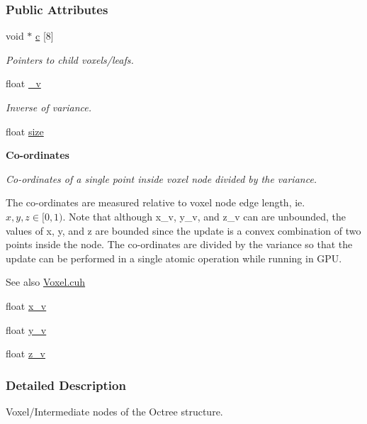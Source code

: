 \subsubsection*{Public Attributes}
\begin{DoxyCompactItemize}
\item 
void $\ast$ \hyperlink{classvoxel_aa280f71c0258d85ffef6f1818872a00a}{c} \mbox{[}8\mbox{]}
\begin{DoxyCompactList}\small\item\em Pointers to child voxels/leafs. \end{DoxyCompactList}\item 
float \hyperlink{classvoxel_a01aebb82be393552c039c11a2c168845}{\+\_\+v}
\begin{DoxyCompactList}\small\item\em Inverse of variance. \end{DoxyCompactList}\item 
float \hyperlink{classvoxel_a573bae3d6e8383a4b2235d3cd33e7ab6}{size}
\end{DoxyCompactItemize}
\begin{Indent}{\bf Co-\/ordinates}\par
{\em Co-\/ordinates of a single point inside voxel node divided by the variance.

The co-\/ordinates are measured relative to voxel node edge length, ie. $x, y, z \in [0,1)$. Note that although x\+\_\+v, y\+\_\+v, and z\+\_\+v can are unbounded, the values of x, y, and z are bounded since the update is a convex combination of two points inside the node. The co-\/ordinates are divided by the variance so that the update can be performed in a single atomic operation while running in G\+PU. \begin{DoxySeeAlso}{See also}
\hyperlink{Voxel_8cuh}{Voxel.\+cuh} 
\end{DoxySeeAlso}
}\begin{DoxyCompactItemize}
\item 
float \hyperlink{classvoxel_a263a7912d9018052399d4b99fb220f2e}{x\+\_\+v}
\item 
float \hyperlink{classvoxel_a67b339eef4ce4330a18d15973dcf6a24}{y\+\_\+v}
\item 
float \hyperlink{classvoxel_a66addb3e42303e4a90a745c2174b0043}{z\+\_\+v}
\end{DoxyCompactItemize}
\end{Indent}


\subsubsection{Detailed Description}
Voxel/\+Intermediate nodes of the Octree structure. 

